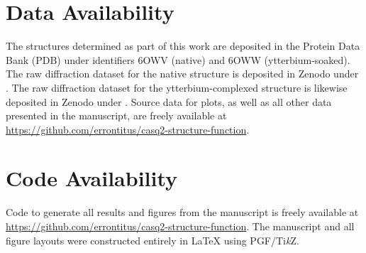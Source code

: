\section*{Data Availability}
The structures determined as part of this work are deposited in the Protein Data Bank (PDB) under identifiers 6OWV (native) and 6OWW (ytterbium-soaked). The raw diffraction dataset for the native structure is deposited in Zenodo under . The raw diffraction dataset for the ytterbium-complexed structure is likewise deposited in Zenodo under . Source data for plots, as well as all other data presented in the manuscript, are freely available at \url{https://github.com/errontitus/casq2-structure-function}.

\section*{Code Availability}
Code to generate all results and figures from the manuscript is freely available at \url{https://github.com/errontitus/casq2-structure-function}. The manuscript and all figure layouts were constructed entirely in \LaTeX{} using PGF/Ti\textit{k}Z. 
